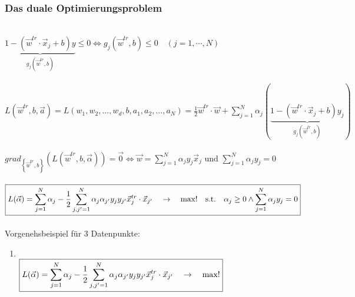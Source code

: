 \subsubsection{Das duale Optimierungsproblem}
\\
$\boxed{\underbrace{1-\left(\vec{w}^{tr}\cdot\vec{x}_j+b\right)y}_{g_j(\vec{w}^{tr},b)}\leq0\Leftrightarrow g_j(\vec{w}^{tr},b)\leq0\quad\left(j=1,\cdots,N\right)}$\\
\\
$\boxed{L(\vec{w}^{tr},b,\vec{a})=L(w_1,w_2, ...,w_d,b,a_1,a_2, ...,a_N)=\frac12\vec{w}^{tr}\cdot\vec{w}+\sum_{j=1}^N\alpha_j\left(\underbrace{1-\left(\vec{w}^{tr}\cdot\vec{x}_j+b\right)y_j}_{g_j\left(\vec{w}^{tr},b\right)}\right)}$\\
\\
$\boxed{grad_{\left\{\vec{w}^{tr},b\right\}}\left(L(\vec{w}^{tr},b,\vec{\alpha})\right)=\vec{0}} \Leftrightarrow 
\boxed{\vec{w}=\sum_{j=1}^N\alpha_jy_j\vec{x}_j} \text{ und }
\boxed{\sum_{j=1}^N\alpha_jy_j=0}$\\
\\
$\boxed{L(\vec{\alpha})=\sum_{j=1}^N\alpha_j-\frac12\sum_{j,j'=1}^N\alpha_j\alpha_{j'} \space y_jy_{j'} \space \vec{x}_j^{tr}\cdot\vec{x}_{j'}\quad\to\quad\max!\quad\mathrm{s.t.}\quad\alpha_j\geq0\wedge\sum_{j=1}^N\alpha_jy_j=0}$\\

\newcolumn
{}\\
Vorgenehsbeispiel für 3 Datenpunkte:
\begin{enumerate}
    \item {}\\
    $\boxed{L(\vec{\alpha})=\sum_{j=1}^N\alpha_j-\frac{1}{2}\sum_{j,j'=1}^N\alpha_j\alpha_{j'} \space y_jy_{j'} \space \vec{x}_j^{tr}\cdot\vec{x}_{j'}\quad\to\quad\max!}$\\
\end{enumerate}

